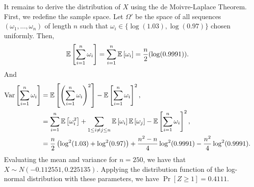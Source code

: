 \begin{solution}
    It remains to derive the distribution of $X$ using the de Moivre-Laplace Theorem. First, we redefine the sample space. Let $\Omega'$ be the space of all sequences $(\omega_1,\ldots,\omega_n)$ of length $n$ such that $\omega_i \in \{\log(1.03),\log(0.97)\}$ chosen uniformly. Then,
    \[
        \mathbb{E}\left[\sum_{i=1}^n \omega_i\right] = \sum_{i=1}^n \mathbb{E}\left[\omega_i\right] = \frac{n}{2}(\log(0.9991)).
    \]
    And
    \begin{align*}
        \operatorname{Var}\left[{\sum_{i=1}^n \omega_i}\right] &= \mathbb{E}\left[\left(\sum_{i=1}^n \omega_i\right)^2\right] - \mathbb{E}\left[\sum_{i=1}^n \omega_i\right]^2, \\
        &= \sum_{i=1}^n \mathbb{E}\left[\omega_i^2\right] + \sum_{1\leq i\neq j\leq n} \mathbb{E}\left[\omega_i\right]\mathbb{E}\left[\omega_j\right] - \mathbb{E}\left[\sum_{i=1}^n\omega_i\right]^2, \\
        &= \frac{n}{2}\left(\log^2(1.03) + \log^2(0.97)\right) + \frac{n^2 - n}{4}\log^2(0.9991) - \frac{n^2}{4} \log^2(0.9991). 
    \end{align*}
    Evaluating the mean and variance for $n=250$, we have that $X \sim N(-0.112551, 0.225135)$. Applying the distribution function of the log-normal distribution with these parameters, we have $\Pr[Z \geq 1] = 0.4111$.
\end{solution}